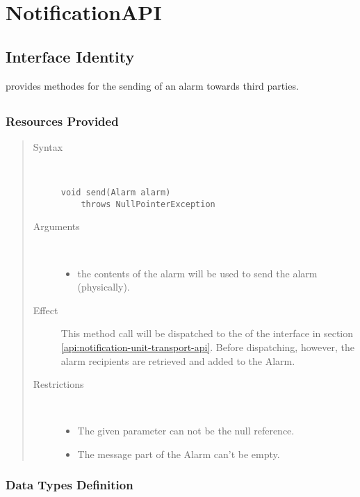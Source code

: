 \section{NotificationAPI}
\label{api:notifcation-api}

\subsection{Interface Identity}

\npar {} provides methodes for the sending of an alarm
towards third parties.

\subsection{}

\subsubsection{Resources Provided}

\begin{quote}
	\begin{description}
		\item[Syntax] \
		\begin{verbatim}
void send(Alarm alarm)
    throws NullPointerException
		\end{verbatim}
		\item[Arguments] \
		\begin{itemize}
		  \item the contents of the alarm will be used to send the alarm (physically). 
		\end{itemize}
		\item[Effect] This method call will be dispatched to the 
		of the interface in section \ref{api:notification-unit-transport-api}. Before
		dispatching, however, the alarm recipients are retrieved and added to the
		Alarm.
		\item[Restrictions] \
		\begin{itemize}
		  \item The given parameter can not be the null reference.
		  \item The message part of the Alarm can't be empty.
		\end{itemize}
	\end{description} 
\end{quote}

\subsubsection{Data Types Definition}

